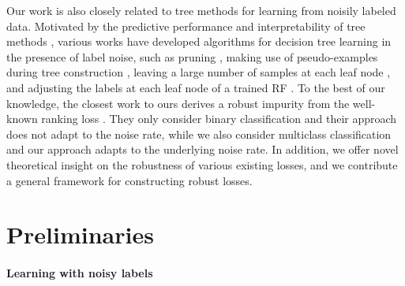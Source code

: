 \documentclass[letterpaper]{article} %
\begin{document}
Our work is also closely related to tree methods for learning from noisily
labeled data.
Motivated by the predictive performance and interpretability of tree methods
\cite{breiman1984classification,breiman2001random,geurts2006extremely}, 
various works have developed algorithms for decision tree learning in the
presence of label noise, such as pruning \cite{breiman1984classification},
making use of pseudo-examples during tree construction \cite{mantas2014credal},
leaving a large number of samples at each leaf node \cite{ghosh2017robustness}, 
and adjusting the labels at each leaf node of a trained RF \cite{zhou2019improving}.
To the best of our knowledge, the closest work to ours derives a robust impurity
from the well-known ranking loss \cite{yang2019robust}.
They only consider binary classification and their approach does not adapt to
the noise rate, while we also consider multiclass classification and our
approach adapts to the underlying noise rate.
In addition, we offer novel theoretical insight on the robustness of various
existing losses, and we contribute a general framework for constructing robust
losses.




\section{Preliminaries}\label{sec:background}

\paragraph{Learning with noisy labels}
\end{document}
